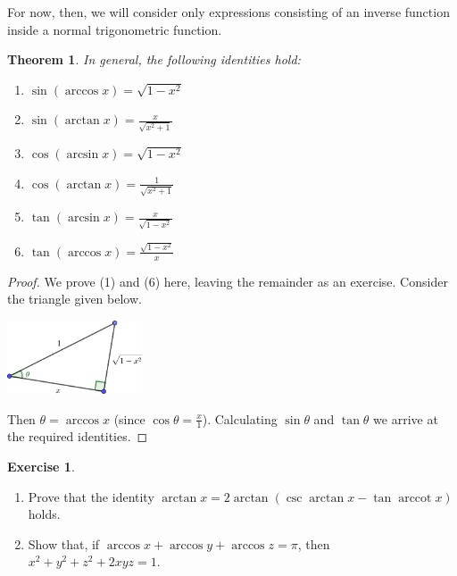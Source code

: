 \documentclass[a4paper,leqno]{article}
\numberwithin{equation}{section}
\newtheorem{thm}[equation]{Theorem}
\theoremstyle{definition}
\newtheorem{exercise}[equation]{Exercise}
\theoremstyle{remark}
\DeclareMathOperator{\arccot}{arccot}
\begin{document}
For now, then, we will consider only expressions consisting of an inverse function inside a normal trigonometric function.
\begin{thm}
  In general, the following identities hold:
  \begin{enumerate}
    \item $ \sin(\arccos x) = \sqrt{1 - x^2} $
    \item $ \sin(\arctan x) = \frac{x}{\sqrt{x^2 + 1}} $
    \item $ \cos(\arcsin x) = \sqrt{1 - x^2} $
    \item $ \cos(\arctan x) = \frac{1}{\sqrt{x^2 + 1}} $
    \item $ \tan(\arcsin x) = \frac{x}{\sqrt{1 - x^2}} $
    \item $ \tan(\arccos x) = \frac{\sqrt{1 - x^2}}{x} $
  \end{enumerate}
\end{thm}
\begin{proof}
  We prove (1) and (6) here, leaving the remainder as an exercise. Consider the triangle given below.
  \begin{center}
    \includegraphics[width=0.3\textwidth]{invid1}
  \end{center}
  Then $ \theta = \arccos x $ (since $ \cos \theta = \frac{x}{1} $). Calculating $ \sin \theta $ and $ \tan \theta $
  we arrive at the required identities.
\end{proof}

\begin{exercise}\leavevmode
  \begin{enumerate}
    \item Prove that the identity $ \arctan x = 2\arctan(\csc \arctan x - \tan \arccot x) $ holds.
    \item Show that, if $ \arccos x + \arccos y + \arccos z = \pi $, then $ x^2 + y^2 + z^2 + 2xyz = 1 $.
  \end{enumerate}
\end{exercise}
\end{document}
